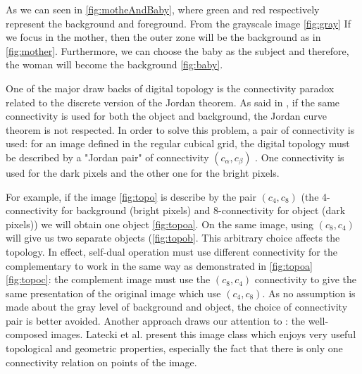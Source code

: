 \par
As we can seen in \ref{fig:motheAndBaby}, where green and red respectively represent the background and foreground. From the grayscale image \ref{fig:gray} If we focus in the mother, then the outer zone will be the background as in \ref{fig:mother}. Furthermore, we can choose the baby as the subject and therefore, the woman will become the background \ref{fig:baby}.	
\par
One of the major draw backs of digital topology is the connectivity paradox related to the discrete version of the Jordan theorem. As said in \cite{Kong:1989:DTI:71397.71400}, if the same connectivity is used for both the object and background, the Jordan curve theorem is not respected. In order to solve this problem, a pair of connectivity is used: for an image defined in the regular cubical grid, the digital topology must be described by a "Jordan pair" of connectivity $(c_\alpha,c_\beta)$ . One connectivity is used for the dark pixels and the other one for the bright pixels. 
\par 
For example, if the image \ref{fig:topo} is describe by the pair $(c_4,c_8)$ (the 4-connectivity for background (bright pixels) and 8-connectivity for object (dark pixels)) we will obtain one object \ref{fig:topoa}. On the same image, using $(c_8,c_4)$ will give us two separate objects (\ref{fig:topob}. This arbitrary choice affects the topology. In effect, self-dual operation must use different connectivity for the complementary to work in the same way as demonstrated in \ref{fig:topoa} \ref{fig:topoc}: the complement image must use the $(c_8,c_4)$ connectivity to give the same presentation of the original image which use $(c_4,c_8)$. As no assumption is made about the gray level of background and object, the choice of connectivity pair is better avoided. Another approach draws our attention to : the well-composed images. Latecki et al. \cite{Latecki95} present this image class which enjoys very useful topological and geometric properties, especially the fact that there is only one connectivity relation on points of the image.

